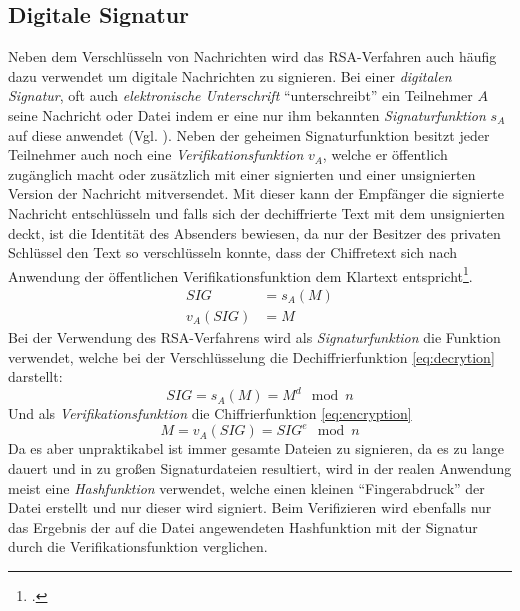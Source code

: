 \documentclass{scrarticle} %
\begin{document}
    \subsection{Digitale Signatur} %
        Neben dem Verschlüsseln von Nachrichten wird das RSA-Verfahren auch häufig dazu verwendet um digitale Nachrichten zu signieren. Bei einer \emph{digitalen Signatur}, oft auch \emph{elektronische Unterschrift} \enquote{unterschreibt} ein Teilnehmer $A$ seine Nachricht oder Datei indem er eine nur ihm bekannten \emph{Signaturfunktion} $s_A$ auf diese anwendet (Vgl. \cite[40-43]{beutelspacher2015}). Neben der geheimen Signaturfunktion besitzt jeder Teilnehmer auch noch eine \emph{Verifikationsfunktion} $v_A$, welche er öffentlich zugänglich macht oder zusätzlich mit einer signierten und einer unsignierten Version der Nachricht mitversendet. Mit dieser kann der Empfänger die signierte Nachricht entschlüsseln und falls sich der dechiffrierte Text mit dem unsignierten deckt, ist die Identität des Absenders bewiesen, da nur der Besitzer des privaten Schlüssel den Text so verschlüsseln konnte, dass der Chiffretext sich nach Anwendung der öffentlichen Verifikationsfunktion dem Klartext entspricht\footcite[Vgl.][68]{watjen2008}.
        \begin{align}
            SIG &= s_A(M) \\
            v_A(SIG) &= M
        \end{align}
        Bei der Verwendung des RSA-Verfahrens wird als \emph{Signaturfunktion} die Funktion verwendet, welche bei der Verschlüsselung die Dechiffrierfunktion \ref{eq:decrytion} darstellt:
        \begin{equation}
            SIG = s_A(M) = M^{d}\mod{n}
        \end{equation}
        Und als \emph{Verifikationsfunktion} die Chiffrierfunktion \ref{eq:encryption}
        \begin{equation}
            M = v_A(SIG) = SIG^{e}\mod{n}
        \end{equation}
        Da es aber unpraktikabel ist immer gesamte Dateien zu signieren, da es zu lange dauert und in zu großen Signaturdateien resultiert, wird in der realen Anwendung meist eine \emph{Hashfunktion} verwendet, welche einen kleinen \enquote{Fingerabdruck} der Datei erstellt und nur dieser wird signiert. Beim Verifizieren wird ebenfalls nur das Ergebnis der auf die Datei angewendeten Hashfunktion mit der Signatur durch die Verifikationsfunktion verglichen.
\end{document}
